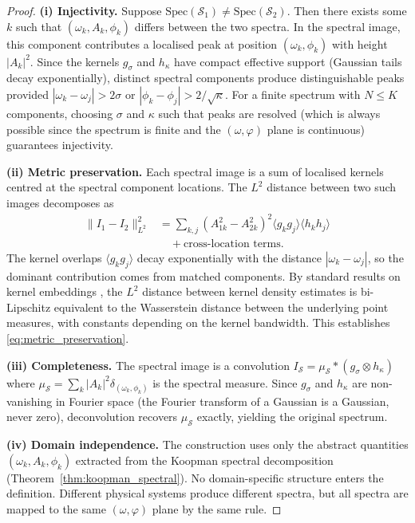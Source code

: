 \documentclass[11pt,twocolumn,a4paper]{article}
\newcommand{\Spec}{\mathrm{Spec}}
\begin{document}
\begin{proof}
\textbf{(i) Injectivity.} Suppose
$\Spec(\mathcal{S}_1) \neq \Spec(\mathcal{S}_2)$. Then there exists
some $k$ such that $(\omega_k, A_k, \phi_k)$ differs between the two
spectra. In the spectral image, this component contributes a localised
peak at position $(\omega_k, \phi_k)$ with height $|A_k|^2$. Since
the kernels $g_\sigma$ and $h_\kappa$ have compact effective support
(Gaussian tails decay exponentially), distinct spectral components
produce distinguishable peaks provided
$|\omega_k - \omega_j| > 2\sigma$ or
$|\phi_k - \phi_j| > 2/\sqrt{\kappa}$. For a finite spectrum with
$N \leq K$ components, choosing $\sigma$ and $\kappa$ such that
peaks are resolved (which is always possible since the spectrum is
finite and the $(\omega, \varphi)$ plane is continuous) guarantees
injectivity.

\textbf{(ii) Metric preservation.} Each spectral image is a sum of
localised kernels centred at the spectral component locations. The $L^2$
distance between two such images decomposes as
\begin{align}
  \|I_1 - I_2\|_{L^2}^2 &= \sum_{k,j} (A_{1k}^2 - A_{2k}^2)^2
    \langle g_k g_j \rangle \langle h_k h_j \rangle \nonumber \\
  &\quad + \text{cross-location terms}.
\end{align}
The kernel overlaps $\langle g_k g_j \rangle$ decay exponentially with
the distance $|\omega_k - \omega_j|$, so the dominant contribution
comes from matched components. By standard results on kernel embeddings
\citep{indyk1998}, the $L^2$ distance between kernel density estimates
is bi-Lipschitz equivalent to the Wasserstein distance between the
underlying point measures, with constants depending on the kernel
bandwidth. This establishes \eqref{eq:metric_preservation}.

\textbf{(iii) Completeness.} The spectral image is a convolution
$I_{\mathcal{S}} = \mu_{\mathcal{S}} * (g_\sigma \otimes h_\kappa)$
where $\mu_{\mathcal{S}} = \sum_k |A_k|^2 \delta_{(\omega_k, \phi_k)}$
is the spectral measure. Since $g_\sigma$ and $h_\kappa$ are
non-vanishing in Fourier space (the Fourier transform of a Gaussian is
a Gaussian, never zero), deconvolution recovers $\mu_{\mathcal{S}}$
exactly, yielding the original spectrum.

\textbf{(iv) Domain independence.} The construction uses only the
abstract quantities $(\omega_k, A_k, \phi_k)$ extracted from the
Koopman spectral decomposition (Theorem~\ref{thm:koopman_spectral}).
No domain-specific structure enters the definition. Different physical
systems produce different spectra, but all spectra are mapped to the
same $(\omega, \varphi)$ plane by the same rule.
\end{proof}
\end{document}
